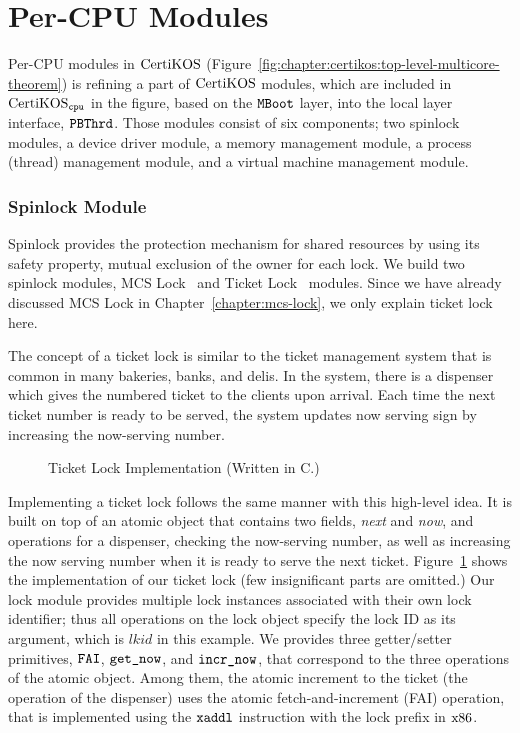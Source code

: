 \section{Per-CPU Modules}
\label{chapter:certikos:sec:per-cpu-modules}

Per-CPU modules in $\mathrm{CertiKOS}$ (Figure~\ref{fig:chapter:certikos:top-level-multicore-theorem}) is refining a part of $\mathrm{CertiKOS}$ modules,
which are included in $\mathrm{CertiKOS}_{{\mathrm{\texttt{cpu}}}}$ in the figure, based on the ${\mathrm{\texttt{MBoot}}}$ layer, 
into the local layer interface, ${\mathrm{\texttt{PBThrd}}}$.
Those modules consist of six components;
two spinlock modules, a device driver module, a memory management module,  a process (thread) management module, and a virtual machine management module. 


\subsubsection{Spinlock Module}


Spinlock provides the protection mechanism for shared resources by using its safety property, mutual exclusion of the owner for each lock. 
We build two spinlock modules, 
MCS Lock~\cite{mcs91} and Ticket Lock~\cite{lwn:ticketlocks} modules.
Since we have already discussed MCS Lock in Chapter~\ref{chapter:mcs-lock}, 
we only explain ticket lock here.

The concept of a ticket lock is similar to the ticket management system that is common in many bakeries, banks, and delis. 
In the system, 
there is a dispenser which gives the numbered ticket to the clients upon arrival. 
Each time the next ticket number is ready to 
be served, 
the system updates now serving sign by increasing the now-serving number. 
\begin{figure}
 
\caption{Ticket Lock Implementation (Written in C.)}
\label{fig:chapter:certikos:ticket-lock-example}
\end{figure}
Implementing a ticket lock follows the same manner with this high-level idea.
It is built on top of an atomic object that contains two fields, \textit{next} and \textit{now},
and operations for a dispenser, checking the now-serving number, as well as increasing the now serving number when
it is ready to serve the next ticket. 
Figure~\ref{fig:chapter:certikos:ticket-lock-example} shows the implementation of our ticket lock (few insignificant parts are omitted.)
Our lock module provides multiple lock instances associated with their own lock identifier;
thus all operations on the lock object specify the lock ID as its argument, which is $lkid$ in this example.
We provides three getter/setter primitives, ${\mathrm{\texttt{FAI}}}$, ${\mathrm{\texttt{get\_now}}}$, and ${\mathrm{\texttt{incr\_now}}}$,
that correspond to the three operations of the atomic object.
Among them, the atomic increment to the ticket (the operation of the dispenser) 
uses the atomic fetch-and-increment (FAI) operation, that is implemented using the ${\mathrm{\texttt{xaddl}}}$ instruction with the 
lock prefix in $\mathrm{x86}$.

